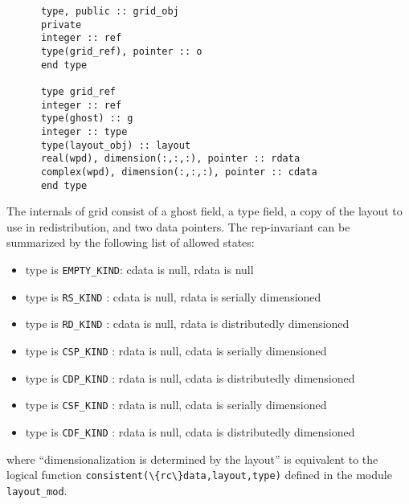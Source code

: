 \begin{verbatim}
      type, public :: grid_obj
      private
      integer :: ref
      type(grid_ref), pointer :: o
      end type

      type grid_ref
      integer :: ref
      type(ghost) :: g
      integer :: type
      type(layout_obj) :: layout
      real(wpd), dimension(:,:,:), pointer :: rdata
      complex(wpd), dimension(:,:,:), pointer :: cdata
      end type 
\end{verbatim}
The internals of grid consist of a ghost field, a type field, a copy
of the layout to use in redistribution, and two data pointers.  The 
rep-invariant can be summarized by the following list of allowed states:
\begin{itemize}
\item type is \verb+EMPTY_KIND+: cdata is null, rdata is null
\item type is \verb+RS_KIND+   : cdata is null, rdata is serially dimensioned
\item type is \verb+RD_KIND+   : cdata is null, rdata is distributedly dimensioned
\item type is \verb+CSP_KIND+  : rdata is null, cdata is serially dimensioned
\item type is \verb+CDP_KIND+  : rdata is null, cdata is distributedly dimensioned
\item type is \verb+CSF_KIND+  : rdata is null, cdata is serially dimensioned
\item type is \verb+CDF_KIND+  : rdata is null, cdata is distributedly dimensioned
\end{itemize}
where ``dimensionalization is determined by the layout'' is equivalent to
the logical function \verb+consistent(\{rc\}data,layout,type)+ defined in
the module \verb+layout_mod+.

